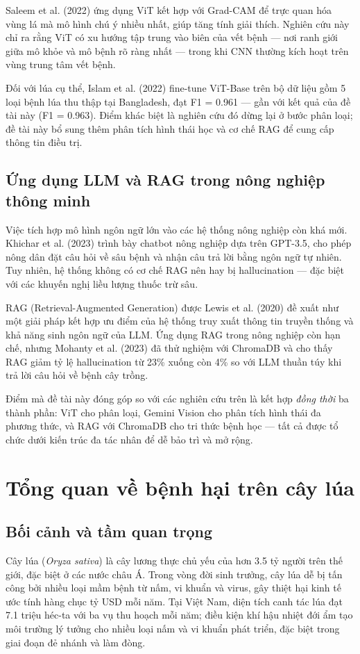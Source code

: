 \documentclass[13pt,a4paper]{extreport}
\begin{document}
Saleem et al. (2022) \cite{saleem2022} ứng dụng ViT kết hợp với Grad-CAM để trực quan hóa vùng lá mà mô hình chú ý nhiều nhất, giúp tăng tính giải thích. Nghiên cứu này chỉ ra rằng ViT có xu hướng tập trung vào biên của vết bệnh --- nơi ranh giới giữa mô khỏe và mô bệnh rõ ràng nhất --- trong khi CNN thường kích hoạt trên vùng trung tâm vết bệnh.

Đối với lúa cụ thể, Islam et al. (2022) \cite{islam2022} fine-tune ViT-Base trên bộ dữ liệu gồm 5 loại bệnh lúa thu thập tại Bangladesh, đạt F1 = 0.961 --- gần với kết quả của đề tài này (F1 = 0.963). Điểm khác biệt là nghiên cứu đó dừng lại ở bước phân loại; đề tài này bổ sung thêm phân tích hình thái học và cơ chế RAG để cung cấp thông tin điều trị.

\subsection{Ứng dụng LLM và RAG trong nông nghiệp thông minh}

Việc tích hợp mô hình ngôn ngữ lớn vào các hệ thống nông nghiệp còn khá mới. Khichar et al. (2023) \cite{khichar2023} trình bày chatbot nông nghiệp dựa trên GPT-3.5, cho phép nông dân đặt câu hỏi về sâu bệnh và nhận câu trả lời bằng ngôn ngữ tự nhiên. Tuy nhiên, hệ thống không có cơ chế RAG nên hay bị hallucination --- đặc biệt với các khuyến nghị liều lượng thuốc trừ sâu.

RAG (Retrieval-Augmented Generation) được Lewis et al. (2020) \cite{lewis2020} đề xuất như một giải pháp kết hợp ưu điểm của hệ thống truy xuất thông tin truyền thống và khả năng sinh ngôn ngữ của LLM. Ứng dụng RAG trong nông nghiệp còn hạn chế, nhưng Mohanty et al. (2023) \cite{mohanty2023} đã thử nghiệm với ChromaDB và cho thấy RAG giảm tỷ lệ hallucination từ 23\% xuống còn 4\% so với LLM thuần túy khi trả lời câu hỏi về bệnh cây trồng.

Điểm mà đề tài này đóng góp so với các nghiên cứu trên là kết hợp \emph{đồng thời} ba thành phần: ViT cho phân loại, Gemini Vision cho phân tích hình thái đa phương thức, và RAG với ChromaDB cho tri thức bệnh học --- tất cả được tổ chức dưới kiến trúc đa tác nhân để dễ bảo trì và mở rộng.

\section{Tổng quan về bệnh hại trên cây lúa}

\subsection{Bối cảnh và tầm quan trọng}
Cây lúa (\textit{Oryza sativa}) là cây lương thực chủ yếu của hơn 3.5 tỷ người trên thế giới, đặc biệt ở các nước châu Á. Trong vòng đời sinh trưởng, cây lúa dễ bị tấn công bởi nhiều loại mầm bệnh từ nấm, vi khuẩn và virus, gây thiệt hại kinh tế ước tính hàng chục tỷ USD mỗi năm. Tại Việt Nam, diện tích canh tác lúa đạt 7.1 triệu héc-ta với ba vụ thu hoạch mỗi năm; điều kiện khí hậu nhiệt đới ẩm tạo môi trường lý tưởng cho nhiều loại nấm và vi khuẩn phát triển, đặc biệt trong giai đoạn đẻ nhánh và làm đòng.
\end{document}
